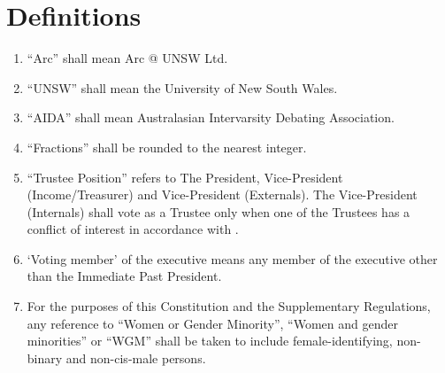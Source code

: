 \newpage
\section{Definitions}

\begin{enumerate}
\item “Arc” shall mean Arc @ UNSW Ltd.
\item “UNSW” shall mean the University of New South Wales.
\item “AIDA” shall mean Australasian Intervarsity Debating Association.
\item “Fractions” shall be rounded to the nearest integer.
\item “Trustee Position” refers to The President, Vice-President (Income/Treasurer) and Vice-President (Externals). The Vice-President (Internals) shall vote as a Trustee only when one of the Trustees has a conflict of interest in accordance with .
\item ‘Voting member’ of the executive means any member of the executive other than the Immediate Past President.
\item For the purposes of this Constitution and the Supplementary Regulations, any reference to “Women or Gender Minority”, “Women and gender minorities” or “WGM” shall be taken to include female-identifying, non-binary and non-cis-male persons.
\end{enumerate}
